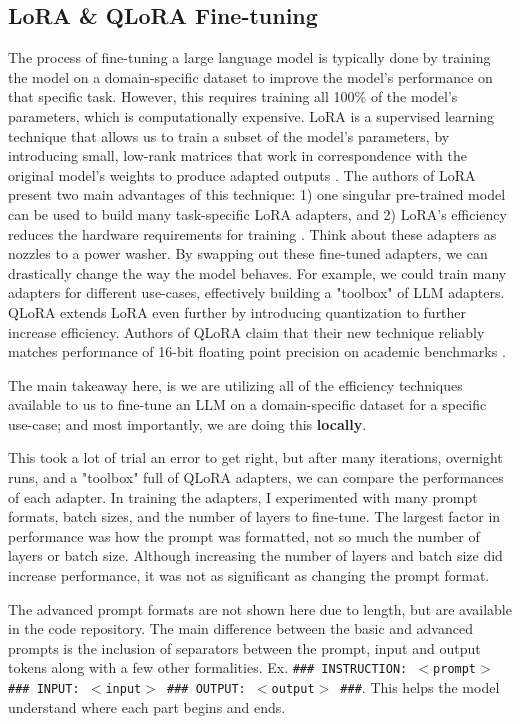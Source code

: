 \documentclass[12pt]{article}
\begin{document}
\subsection{LoRA \& QLoRA Fine-tuning}
The process of fine-tuning a large language model is typically done by training the model on a domain-specific dataset to improve the model's performance on that specific task. However, this requires training all 100\% of the model's parameters, which is computationally expensive. LoRA is a supervised learning technique that allows us to train a subset of the model's parameters, by introducing small, low-rank matrices that work in correspondence with the original model's weights to produce adapted outputs \cite[page 2]{hu2021lora}. The authors of LoRA present two main advantages of this technique: 1) one singular pre-trained model can be used to build many task-specific LoRA adapters, and 2) LoRA's efficiency reduces the hardware requirements for training \cite[page 2]{hu2021lora}. Think about these adapters as nozzles to a power washer. By swapping out these fine-tuned adapters, we can drastically change the way the model behaves. For example, we could train many adapters for different use-cases, effectively building a "toolbox" of LLM adapters. QLoRA extends LoRA even further by introducing quantization to further increase efficiency. Authors of QLoRA claim that their new technique reliably matches performance of 16-bit floating point precision on academic benchmarks \cite[page 7]{dettmers2023qlora}.

The main takeaway here, is we are utilizing all of the efficiency techniques available to us to fine-tune an LLM on a domain-specific dataset for a specific use-case; and most importantly, we are doing this \textbf{locally}.

This took a lot of trial an error to get right, but after many iterations, overnight runs, and a "toolbox" full of QLoRA adapters, we can compare the performances of each adapter. In training the adapters, I experimented with many prompt formats, batch sizes, and the number of layers to fine-tune. The largest factor in performance was how the prompt was formatted, not so much the number of layers or batch size. Although increasing the number of layers and batch size did increase performance, it was not as significant as changing the prompt format.

The advanced prompt formats are not shown here due to length, but are available in the code repository. The main difference between the basic and advanced prompts is the inclusion of separators between the prompt, input and output tokens along with a few other formalities. Ex. \texttt{\#\#\# INSTRUCTION: $<$prompt$>$ \#\#\# INPUT: $<$input$>$ \#\#\# OUTPUT: $<$output$>$ \#\#\#}. This helps the model understand where each part begins and ends.
\end{document}
